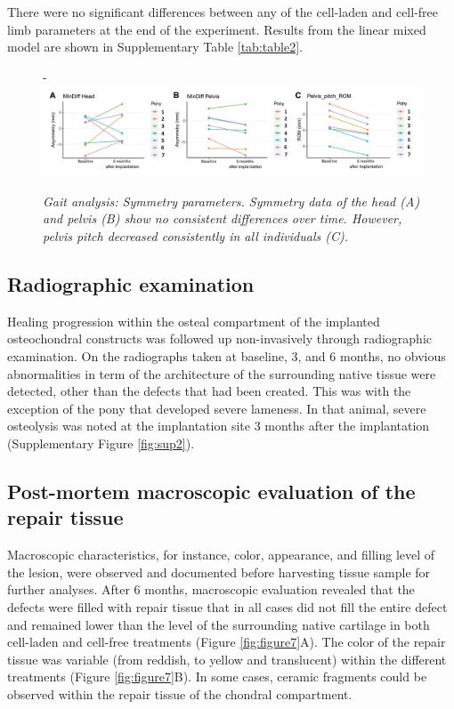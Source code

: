\documentclass[twocolumn, empirical, authordate, issue]{jote-new-article}
\begin{document}
There were no significant differences between any of the cell-laden and cell-free limb parameters at the end of the experiment. Results from the linear mixed model are shown in Supplementary Table \ref{tab:table2}.

\begin{figure}
\captionsetup{width=\dimexpr \textwidth}
\begin{adjustwidth}{-\fullwidthlen}{}
\includegraphics[width=\textwidth+\fullwidthlen]{media/image6.jpg}
\caption{\emph{Gait analysis: Symmetry parameters. \textit{Symmetry data of the head (A) and pelvis (B) show no consistent differences over time. However, pelvis pitch decreased consistently in all individuals (C).}}}
\label{fig:figure6}
\end{adjustwidth}
\end{figure}


\subsection{Radiographic examination} 

Healing progression within the osteal compartment of the implanted osteochondral constructs was followed up non-invasively through radiographic examination. On the radiographs taken at baseline, 3, and 6 months, no obvious abnormalities in term of the architecture of the surrounding native tissue were detected, other than the defects that had been created. This was with the exception of the pony that developed severe lameness. In that animal, severe osteolysis was noted at the implantation site 3 months after the implantation (Supplementary Figure \ref{fig:sup2}).

\subsection{Post-mortem macroscopic evaluation of the repair tissue} 

Macroscopic characteristics, for instance, color, appearance, and filling level of the lesion, were observed and documented before harvesting tissue sample for further analyses. After 6 months, macroscopic evaluation revealed that the defects were filled with repair tissue that in all cases did not fill the entire defect and remained lower than the level of the surrounding native cartilage in both cell-laden and cell-free treatments (Figure \ref{fig:figure7}A). The color of the repair tissue was variable (from reddish, to yellow and translucent) within the different treatments (Figure \ref{fig:figure7}B). In some cases, ceramic fragments could be observed within the repair tissue of the chondral compartment.
\end{document}
